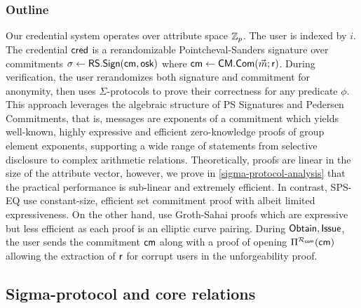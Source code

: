 \subsubsection{Outline}
Our credential system operates over attribute space $\mathbb{Z}_p$. The user is indexed by $i$. The credential $\mathsf{cred}$ is a rerandomizable Pointcheval-Sanders signature over commitments $\sigma \gets \mathsf{RS.Sign}(\mathsf{cm}, \mathsf{osk})$ where $\mathsf{cm} \gets \mathsf{CM.Com}(\vec{m}; \mathsf{r})$. During verification, the user rerandomizes both signature and commitment for anonymity, then uses $\Sigma$-protocols to prove their correctness for any predicate $\phi$. This approach leverages the algebraic structure of PS Signatures and Pedersen Commitments, that is, messages are exponents of a commitment which yields well-known, highly expressive and efficient zero-knowledge proofs of group element exponents, supporting a wide range of statements from selective disclosure to complex arithmetic relations. Theoretically, proofs are linear in the size of the attribute vector, however, we prove in \ref{sigma-protocol-analysis} that the practical performance is sub-linear and extremely efficient. In contrast, SPS-EQ \cite{fuchsbauer_structure-preserving_2019, hanaoka_improved_2022} use constant-size, efficient set commitment proof with albeit limited expressiveness. On the other hand, \cite{rabaninejad_attribute-based_2024} use Groth-Sahai proofs which are expressive but less efficient as each proof is an elliptic curve pairing. During $\mathsf{Obtain}, \mathsf{Issue}$, the user sends the commitment $\mathsf{cm}$ along with a proof of opening $\Pi^{\mathcal{R}_{\mathsf{com}}}(\mathsf{cm})$ allowing the extraction of $\mathsf{r}$ for corrupt users in the unforgeability proof.

\subsection{Sigma-protocol and core relations}

